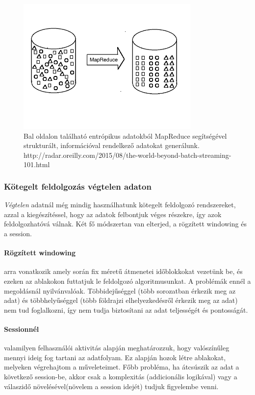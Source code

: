 \documentclass[a4paper,12pt]{article}
\begin{document}
\begin{figure}[ht!]
\centering
\includegraphics[width=90mm]{img/batch.png}
\caption{Bal oldalon található entrópikus adatokból MapReduce segítségével strukturált, információval rendelkező adatokat generálunk.
http://radar.oreilly.com/2015/08/the-world-beyond-batch-streaming-101.html \label{batchreduce}}
\end{figure}

\subsubsection{Kötegelt feldolgozás végtelen adaton}
\textsl{Végtelen} adatnál még mindig használhatunk kötegelt feldolgozó rendszereket, azzal a kiegészítéssel, hogy az adatok felbontjuk véges részekre, így azok feldolgozhatóvá válnak. Két fő módszertan van elterjed, a rögzített windowing és a session.

\paragraph{Rögzített windowing}\hspace*{-0.5cm} arra vonatkozik amely során fix méretű átmenetei időblokkokat vezetünk be, és ezeken az ablakokon futtatjuk le feldolgozó algoritmusunkat. A problémák ennél a megoldásnál nyilvánvalóak. Többidejűséggel (több sorozatban érkezik meg az adat) és többhelyűséggel (több földrajzi elhelyezkedésről érkezik meg az adat) nem tud foglalkozni, így nem tudja biztosítani az adat teljességét és pontosságát.

\paragraph{Sessionnél}\hspace*{-0.4cm} valamilyen felhasználói aktivitás alapján meghatározzuk, hogy valószínűleg mennyi ideig fog tartani az adatfolyam. Ez alapján hozok létre ablakokat, melyeken végrehajtom a műveleteimet. Főbb probléma, ha átcsúszik az adat a következő session-be, akkor csak a komplexitás (addicionális logikával) vagy a válaszidő növelésével(növelem a session idejét) tudjuk figyelembe venni.
\end{document}
